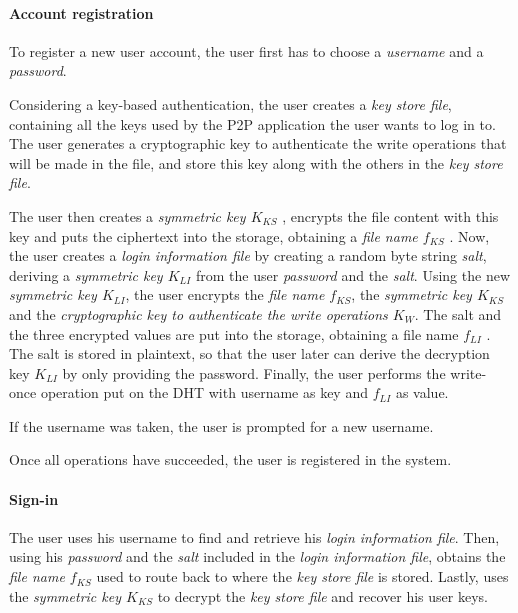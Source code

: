 \documentclass[12pt,spanish]{article}
\begin{document}
\paragraph{Account registration}

To register a new user account, the user first
has to choose a \textit{username} and a \textit{password}.

Considering a key-based authentication, the user creates a \textit{key store file}, containing all the
keys used by the P2P application the user wants to log in to.
The user generates a cryptographic key to authenticate the write operations
that will be made in the file, and store this key along with the others in the
\textit{key store file}.


The user then creates a \textit{symmetric key $K_{KS}$} ,
encrypts the file content with this key and puts the ciphertext
into the storage, obtaining a \textit{file name $f_{KS}$} . Now, the user
creates a \textit{login information file} by creating a random
byte string \textit{salt}, deriving a \textit{symmetric key $K_{LI}$} from the user
\textit{password} and the \textit{salt}.
Using the new \textit{ symmetric key $K_{LI}$}, the user encrypts the
\textit{file name $f_{KS}$},
the \textit{symmetric key $K_{KS}$} and the \textit{cryptographic key to
authenticate the write operations $K_W$}.
 The salt and the three encrypted values are put
into the storage, obtaining a file name $f_{LI}$ . The salt is stored
in plaintext, so that the user later can derive the decryption
key $K_{LI}$ by only providing the password. Finally, the user
performs the write-once operation put on the DHT with
username as key and $f_{LI}$ as value.

If the username was taken,
the user is prompted for a new username.

Once all operations
have succeeded, the user is registered in the system.



\paragraph{Sign-in}
The user uses his username to find and retrieve his \textit{login information
file}. Then, using his \textit{password} and the \textit{salt} included in the
\textit{login information file}, obtains the \textit{file name $f_{KS}$} used to
route back to where the \textit{key store file} is stored.  Lastly, uses the
\textit{symmetric key $K_{KS}$} to decrypt the \textit{key store file} and recover
his user keys.
\end{document}
